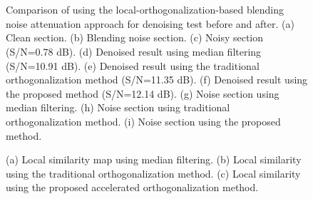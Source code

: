 \begin{figure}[htb!]
\centering
{}
\\
   \\  
\caption{Comparison of using the local-orthogonalization-based blending noise attenuation approach for denoising test before and after. (a) Clean section. (b) Blending noise section. (c) Noisy section (S/N=0.78 dB). (d) Denoised result using median filtering (S/N=10.91 dB). (e) Denoised result using the traditional orthogonalization method (S/N=11.35 dB). (f) Denoised result using the proposed method (S/N=12.14 dB). (g) Noise section using median filtering. (h) Noise section using traditional orthogonalization method. (i) Noise section using the proposed method.}
\label{fig:huo,huo-noise,huos,huos-mf,huos-ortho,huos-ortho2,huosdiff-mf,huosdiff-ortho,huosdiff-ortho2}
\end{figure}

\begin{figure}[htb!]
\centering
{} 
\caption{(a) Local similarity map using median filtering. (b) Local similarity using the traditional orthogonalization method. (c) Local similarity using the proposed accelerated orthogonalization method.}
\label{fig:huos-simi,huos-simi-ortho,huos-simi-ortho2}
\end{figure}

%





